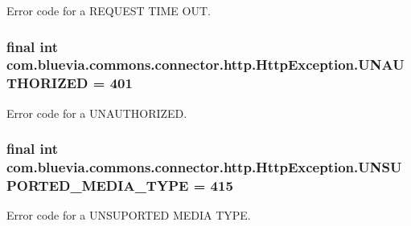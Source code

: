 \label{classcom_1_1bluevia_1_1commons_1_1connector_1_1http_1_1HttpException_a03f7ad83a523e45f27f95a168ecebab6}
Error code for a REQUEST TIME OUT. \hypertarget{classcom_1_1bluevia_1_1commons_1_1connector_1_1http_1_1HttpException_a2e17d92c739069403b02bb64bb1b5db3}{
\subsubsection[{UNAUTHORIZED}]{\setlength{\rightskip}{0pt plus 5cm}final int {\bf com.bluevia.commons.connector.http.HttpException.UNAUTHORIZED} = 401}}
\label{classcom_1_1bluevia_1_1commons_1_1connector_1_1http_1_1HttpException_a2e17d92c739069403b02bb64bb1b5db3}
Error code for a UNAUTHORIZED. \hypertarget{classcom_1_1bluevia_1_1commons_1_1connector_1_1http_1_1HttpException_ae1de92d4e1fa1bbd5213b84e1f1c3224}{
\subsubsection[{UNSUPORTED\_\-MEDIA\_\-TYPE}]{\setlength{\rightskip}{0pt plus 5cm}final int {\bf com.bluevia.commons.connector.http.HttpException.UNSUPORTED\_\-MEDIA\_\-TYPE} = 415}}
\label{classcom_1_1bluevia_1_1commons_1_1connector_1_1http_1_1HttpException_ae1de92d4e1fa1bbd5213b84e1f1c3224}
Error code for a UNSUPORTED MEDIA TYPE. 